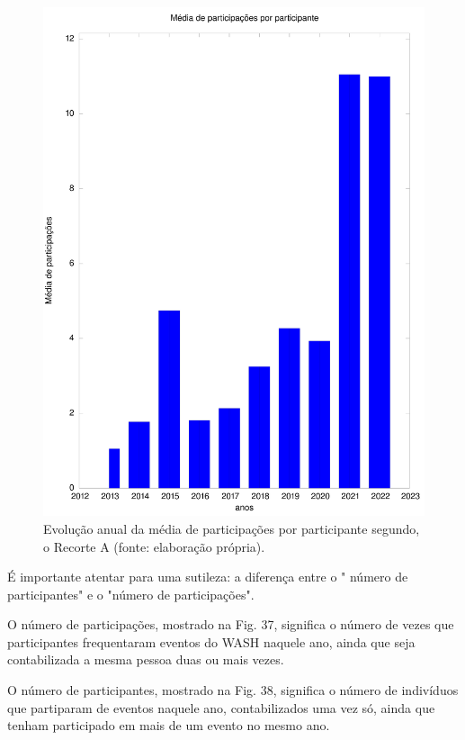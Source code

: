 \begin{figure}[p]
\begin{minipage}[b]{0.4\linewidth}
                \includegraphics[width=1.0\linewidth]{../../../imagens/output-media-participacoes.jpeg}
                \caption{Evolução anual da média de participações por participante segundo, o Recorte A (fonte: elaboração própria).}
                \label{a8f2d72073b88290f9b8731b144383d2f7c4dc4b}
\end{minipage}%
\hspace{0.5cm}
\end{figure}



É importante atentar para uma sutileza: a diferença entre o " número de participantes" e o "número de participações".

O número de participações, mostrado na Fig. 37, significa o número de vezes que participantes frequentaram eventos do WASH naquele ano, ainda que seja contabilizada a mesma pessoa duas ou mais vezes.

O número de participantes, mostrado na Fig. 38, significa o número de indivíduos que partiparam de eventos naquele ano, contabilizados uma vez só, ainda que tenham participado em mais de um evento no mesmo ano.

